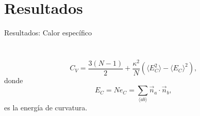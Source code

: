 \documentclass[xcolor=dvipsnames]{beamer}
\begin{document}
\section{Resultados}
\begin{frame}{Resultados: Calor específico}
\begin{columns}
  \begin{column}{5.8cm}
    \begin{figure}[h]
      \centering
      \resizebox{\columnwidth}{!}{}
    \end{figure}
  \end{column}
  \begin{column}{5.8cm}
    \begin{figure}[h]
      \centering
     \resizebox{\columnwidth}{!}{ }
    \end{figure}
  \end{column}
\end{columns}
\begin{equation*}
 C_V=\frac{3(N-1)}{2}+\frac{\kappa^2}{N}(\langle E_C^2 \rangle-\langle E_C
\rangle^2),
\end{equation*}
donde
\begin{equation*}
E_C=Ne_C=\sum_{\langle ab \rangle}\vec{n}_a\cdot\vec{n}_b, 
\end{equation*}
es la energía de curvatura.
\end{frame}
\end{document}
